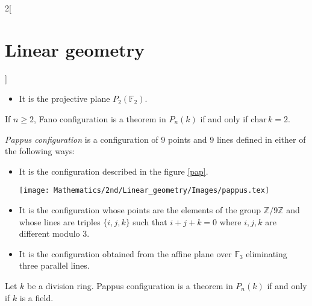 \documentclass[class=article,10pt,crop=false]{standalone}
\begin{document}
\begin{multicols}{2}[\section{Linear geometry}]
\begin{definition}
\begin{itemize}
    \item It is the projective plane $P_2(\mathbb{F}_2)$.
\end{itemize}
\end{definition}
\begin{theorem}
If $n\geq 2$, Fano configuration is a theorem in $P_n(k)$ if and only if $\text{char}\,k=2$.
\end{theorem}
\begin{definition}
\textit{Pappus configuration} is a configuration of 9 points and 9 lines defined in either of the following ways:
\begin{itemize}
    \item It is the configuration described in the figure \ref{pap}.\par
    \begin{minipage}{\linewidth}
        \centering
        \texttt{[image: Mathematics/2nd/Linear\_geometry/Images/pappus.tex]} 
        \label{pap}
    \end{minipage} 
    \item It is the configuration whose points are the elements of the group $\mathbb{Z}/9\mathbb{Z}$ and whose lines are triples $\{i,j,k\}$ such that $i+j+k=0$ where $i,j,k$ are different modulo 3.
    \item It is the configuration obtained from the affine plane over $\mathbb{F}_3$ eliminating three parallel lines.
\end{itemize}
\end{definition}
\begin{theorem}
Let $k$ be a division ring. Pappus configuration is a theorem in $P_n(k)$ if and only if $k$ is a field.
\end{theorem}

\end{multicols}
\end{document}
